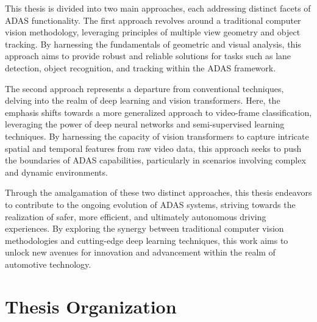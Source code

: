 This thesis is divided into two main approaches, each addressing distinct facets of ADAS functionality. The first approach revolves around a traditional computer vision methodology, leveraging principles of multiple view geometry and object tracking. By harnessing the fundamentals of geometric and visual analysis, this approach aims to provide robust and reliable solutions for tasks such as lane detection, object recognition, and tracking within the ADAS framework.

The second approach represents a departure from conventional techniques, delving into the realm of deep learning and vision transformers. Here, the emphasis shifts towards a more generalized approach to video-frame classification, leveraging the power of deep neural networks and semi-supervised learning techniques. By harnessing the capacity of vision transformers to capture intricate spatial and temporal features from raw video data, this approach seeks to push the boundaries of ADAS capabilities, particularly in scenarios involving complex and dynamic environments.

Through the amalgamation of these two distinct approaches, this thesis endeavors to contribute to the ongoing evolution of ADAS systems, striving towards the realization of safer, more efficient, and ultimately autonomous driving experiences. By exploring the synergy between traditional computer vision methodologies and cutting-edge deep learning techniques, this work aims to unlock new avenues for innovation and advancement within the realm of automotive technology.


\section{Thesis Organization}
\lipsum[1-2]
